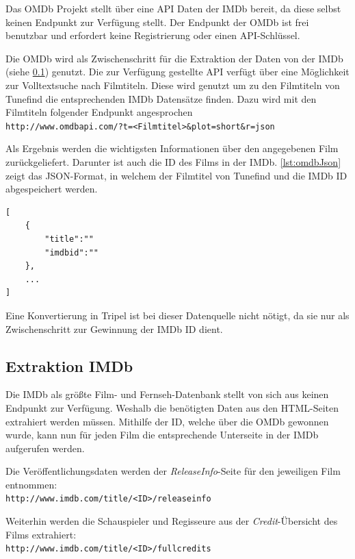 \documentclass[parskip]{scrartcl}
\begin{document}
Das OMDb Projekt stellt über eine API Daten der IMDb bereit, da diese selbst keinen Endpunkt zur Verfügung stellt. Der Endpunkt der OMDb ist frei benutzbar und erfordert keine Registrierung oder einen API-Schlüssel.

Die OMDb wird als Zwischenschritt für die Extraktion der Daten von der IMDb (siehe \ref{subsec:imdb}) genutzt. Die zur Verfügung gestellte API verfügt über eine Möglichkeit zur Volltextsuche nach Filmtiteln. Diese wird genutzt um zu den Filmtiteln von Tunefind die entsprechenden IMDb Datensätze finden. Dazu wird mit den Filmtiteln folgender Endpunkt angesprochen\\
\texttt{http://www.omdbapi.com/?t=<Filmtitel>\&plot=short\&r=json}

Als Ergebnis werden die wichtigsten Informationen über den angegebenen Film zurückgeliefert. Darunter ist auch die ID des Films in der IMDb. \autoref{lst:omdbJson} zeigt das JSON-Format, in welchem der Filmtitel von Tunefind und die IMDb ID abgespeichert werden.

\begin{lstlisting}[caption={OMDb JSON-Format}, label={lst:omdbJson}]
[  
    {  
        "title":""
        "imdbid":""
    },
    ...
]
\end{lstlisting}

Eine Konvertierung in Tripel ist bei dieser Datenquelle nicht nötigt, da sie nur als Zwischenschritt zur Gewinnung der IMDb ID dient.

\subsection{Extraktion IMDb}
\label{subsec:imdb}

Die IMDb als größte Film- und Fernseh-Datenbank stellt von sich aus keinen Endpunkt zur Verfügung. Weshalb die benötigten Daten aus den HTML-Seiten extrahiert werden müssen. Mithilfe der ID, welche über die OMDb gewonnen wurde, kann nun für jeden Film die entsprechende Unterseite in der IMDb aufgerufen werden.

Die Veröffentlichungsdaten werden der \textit{ReleaseInfo}-Seite für den jeweiligen Film entnommen:\\
\texttt{http://www.imdb.com/title/<ID>/releaseinfo}

Weiterhin werden die Schauspieler und Regisseure aus der \textit{Credit}-Übersicht des Films extrahiert:\\
\texttt{http://www.imdb.com/title/<ID>/fullcredits}
\end{document}
